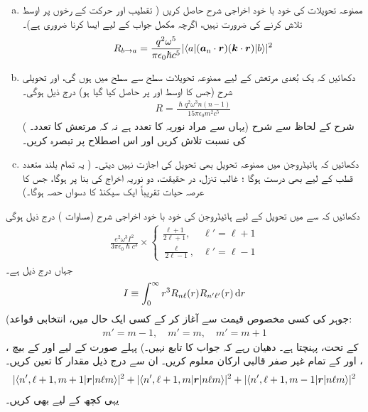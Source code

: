 \begin{enumerate}[a.]
\item
ممنوعہ تحویلات کی خود با خود اخراجی شرح حاصل کریں (  تقطیب اور حرکت کے رخوں  پر اوسط  تلاش کرنے کی ضرورت نہیں،  اگرچہ  مکمل جواب کے لیے ایسا کرنا ضروری ہے)۔ 
\begin{align}
	R_{b\to a} = \frac{q^2\omega^5}{\pi\epsilon_0\hslash c^5}|\langle a|({{\boldsymbol{a}}_{\textup{n}}}\cdot{\ensuremath{{\boldsymbol{r}}}})({\boldsymbol{k}}\cdot {\ensuremath{{\boldsymbol{r}}}})|b \rangle|^2
\end{align}
\item
 دکھائیں کہ یک بُعدی مرتعش کے لیے ممنوعہ تحویلات سطح  سے سطح  میں ہوں گی،  اور تحویلی شرح  (جس کا اوسط   اور  پر حاصل کیا گیا ہو)  درج ذیل ہوگی۔
\begin{align}
	R = \frac{\hslash q^2\omega^3n(n-1)}{15\pi\epsilon_0m^2c^5}
\end{align}
( یہاں  سے مراد نوریہ کا تعدد ہے نہ کہ مرتعش کا تعدد۔) شرح کے لحاظ سے  شرح کی  نسبت  تلاش کریں اور  اس  اصطلاح پر تبصرہ کریں۔
\item
 دکھائیں کہ ہائیڈروجن میں ممنوعہ تحویل بھی  تحویل  کی اجازت نہیں دیتی۔ (  یہ تمام بلند متعدد قطب کے لیے بھی درست ہوگا ؛ غالب تنزل، در حقیقت، دو نوریہ اخراج کی بنا پر ہوگا،  جس کا عرصہ حیات تقریباً ایک  سیکنڈ کا دسواں حصہ ہوگا۔)
 \end{enumerate}
دکھائیں کہ  سے  میں تحویل کے لیے ہائیڈروجن کی  خود با خود اخراجی شرح  (مساوات ) درج ذیل ہوگی
\begin{align}
	\frac{e^2\omega^3I^2}{3\pi\epsilon_0\hslash c^3}\times
	\begin{cases}
		\frac{\ell +1}{2\ell +1}, & \ell '= \ell +1  \\
		\frac{\ell }{2\ell -1}, & \ell '= \ell -1 
	\end{cases}
\end{align}
جہاں  درج ذیل ہے۔
\begin{align}
	I\equiv\int_{0}^{\infty} r^3R_{n\ell }(r)R_{n'\ell '}(r)\dif r
\end{align}
(جوہر  کی کسی مخصوص قیمت سے آغاز کر کے   کسی ایک   حال  میں، انتخابی قواعد:
\begin{align*}
m'=m-1,\quad m'=m,\quad m'=m+1
\end{align*}
  کے تحت،  پہنچتا ہے۔ دھیان رہے کہ جواب  کا تابع  نہیں۔)    پہلے  صورت کے لیے  اور  کے بیچ ، ،  اور  کے تمام غیر صفر قالبی ارکان معلوم کریں۔ ان سے درج ذیل مقدار کا  تعین کریں۔
\begin{align*}
	|\langle n', \ell +1,m+1|{{\boldsymbol{r}}}|n\ell m \rangle|^2 + |\langle n', \ell +1, m|{{\boldsymbol{r}}}|n\ell m \rangle|^2+|\langle n', \ell +1, m-1|{{\boldsymbol{r}}}|n\ell m\rangle|^2
\end{align*}
یہی کچھ  کے لیے بھی کریں۔


